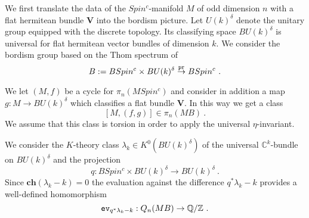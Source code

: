 \documentclass[12pt]{article}
\newcommand{\ev}{{\tt ev}}
\newcommand{\Z}{{\mathbb{Z}}}
\newcommand{\Q}{{\mathbb{Q}}}
\newcommand{\C}{{\mathbb{C}}}
\newcommand{\ch}{{\mathbf{ch}}}
\newcommand{\bV}{{\mathbf{V}}}
\newcommand{\pr}{{\tt pr}}
\begin{document}

 We first translate the data of the $Spin^{c}$-manifold $M$ of odd dimension $n$ with a flat hermitean bundle $\bV$ into the bordism picture.  Let $U(k)^{\delta}$ denote the unitary group equipped with  the discrete topology.
 Its classifying space $BU(k)^{\delta}$ is universal for flat hermitean vector bundles
 of dimension $k$. We consider the bordism group based on the Thom spectrum of
   $$B:=BSpin^{c}\times BU(k)^{\delta}\stackrel{\pr}{\to} BSpin^{c}\ . $$
 
 We let $(M,f)$ be a cycle for $\pi_{n}(MSpin^{c})$ and consider in addition a map
  $g:M\to BU(k)^{\delta}$  which classifies a  flat bundle $\bV$. In this way we get a class
  $$[M,(f,g)]\in \pi_{n}(MB)\ .$$ We assume that this class is torsion in order to apply 
  the universal $\eta$-invariant.

We consider the $K$-theory class $\lambda_{k}\in K^{0}(BU(k)^{\delta})$ of the  universal $\C^{k}$-bundle on $BU(k)^{\delta}$ and    the projection
\begin{equation}\label{eq12000}q:BSpin^{c} \times  BU(k)^{\delta}\to BU(k)^{\delta}\ .\end{equation} 
Since $\ch(\lambda_{k}-k)=0$ the evaluation against the difference $q^{*}\lambda_{k}-k$ provides a well-defined homomorphism
$$\ev_{q^{*}\lambda_{k}-k} :Q_{n}(MB)\to \Q/\Z\ .$$


\end{document}
